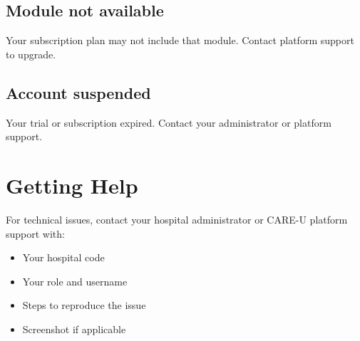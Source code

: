 \documentclass[11pt,a4paper]{report}
\begin{document}
\section{Module not available}

Your subscription plan may not include that module. Contact platform support to upgrade.

\section{Account suspended}

Your trial or subscription expired. Contact your administrator or platform support.

\chapter{Getting Help}

For technical issues, contact your hospital administrator or CARE-U platform support with:
\begin{itemize}[noitemsep]
    \item Your hospital code
    \item Your role and username
    \item Steps to reproduce the issue
    \item Screenshot if applicable
\end{itemize}
\end{document}
